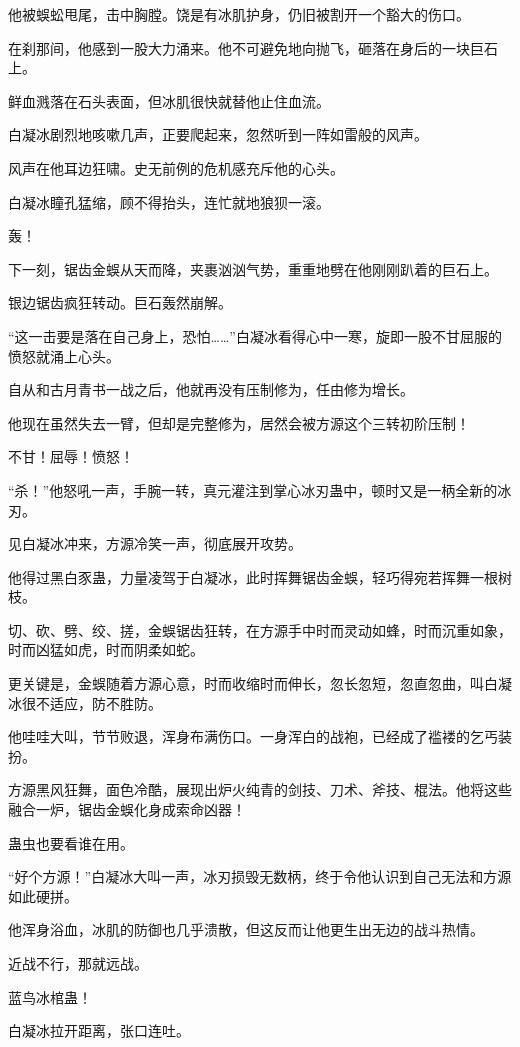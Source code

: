 \begin{this_body}
他被蜈蚣甩尾，击中胸膛。饶是有冰肌护身，仍旧被割开一个豁大的伤口。

在刹那间，他感到一股大力涌来。他不可避免地向抛飞，砸落在身后的一块巨石上。

鲜血溅落在石头表面，但冰肌很快就替他止住血流。

白凝冰剧烈地咳嗽几声，正要爬起来，忽然听到一阵如雷般的风声。

风声在他耳边狂啸。史无前例的危机感充斥他的心头。

白凝冰瞳孔猛缩，顾不得抬头，连忙就地狼狈一滚。

轰！

下一刻，锯齿金蜈从天而降，夹裹汹汹气势，重重地劈在他刚刚趴着的巨石上。

银边锯齿疯狂转动。巨石轰然崩解。

“这一击要是落在自己身上，恐怕……”白凝冰看得心中一寒，旋即一股不甘屈服的愤怒就涌上心头。

自从和古月青书一战之后，他就再没有压制修为，任由修为增长。

他现在虽然失去一臂，但却是完整修为，居然会被方源这个三转初阶压制！

不甘！屈辱！愤怒！

“杀！”他怒吼一声，手腕一转，真元灌注到掌心冰刃蛊中，顿时又是一柄全新的冰刃。

见白凝冰冲来，方源冷笑一声，彻底展开攻势。

他得过黑白豕蛊，力量凌驾于白凝冰，此时挥舞锯齿金蜈，轻巧得宛若挥舞一根树枝。

切、砍、劈、绞、搓，金蜈锯齿狂转，在方源手中时而灵动如蜂，时而沉重如象，时而凶猛如虎，时而阴柔如蛇。

更关键是，金蜈随着方源心意，时而收缩时而伸长，忽长忽短，忽直忽曲，叫白凝冰很不适应，防不胜防。

他哇哇大叫，节节败退，浑身布满伤口。一身浑白的战袍，已经成了褴褛的乞丐装扮。

方源黑风狂舞，面色冷酷，展现出炉火纯青的剑技、刀术、斧技、棍法。他将这些融合一炉，锯齿金蜈化身成索命凶器！

蛊虫也要看谁在用。

“好个方源！”白凝冰大叫一声，冰刃损毁无数柄，终于令他认识到自己无法和方源如此硬拼。

他浑身浴血，冰肌的防御也几乎溃散，但这反而让他更生出无边的战斗热情。

近战不行，那就远战。

蓝鸟冰棺蛊！

白凝冰拉开距离，张口连吐。


\end{this_body}
